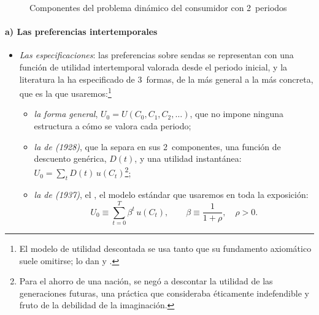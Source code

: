 \documentclass[11pt]{article}
\begin{document}
\begin{itemize}
  \begin{figure}[H]
  \centering
  \caption{Componentes del problema dinámico del consumidor con 2~periodos}\label{fig:componentes}
  \end{figure}
\end{itemize}

\paragraph{a) Las preferencias intertemporales}

\begin{itemize}
\item \emph{Las especificaciones}: las preferencias sobre sendas se representan con una función de utilidad intertemporal valorada desde el periodo inicial, y la literatura la ha especificado de 3~formas, de la más general a la más concreta, que es la que usaremos:\footnote{El modelo de utilidad descontada se usa tanto que su fundamento axiomático suele omitirse; lo dan \textcite{Koopmans1960Stationary} y \textcite{FishburnRubinstein1982Time}.}
  \begin{itemize}
  \item \emph{la forma general}, $U_0=U(C_0,C_1,C_2,\dots)$, que no impone ninguna estructura a cómo se valora cada periodo;
  \item \emph{la de  (1928)}, que la separa en sus 2~componentes, una función de descuento genérica, $D(t)$, y una utilidad instantánea: $U_0=\sum_tD(t)\,u(C_t)$\footnote{Para el ahorro de una nación,  se negó a descontar la utilidad de las generaciones futuras, una práctica que consideraba éticamente indefendible y fruto de la debilidad de la imaginación\nocite{Ramsey1928}.};
  \item \emph{la de  (1937)}, el , el modelo estándar que usaremos en toda la exposición\nocite{Samuelson1937}:
    \begin{equation}
    U_0\equiv\sum_{t=0}^{T}\beta^t\,u(C_t),\qquad\beta\equiv\frac{1}{1+\rho},\quad\rho>0.\label{eq:utilidad-intertemporal}
    \end{equation}
  \end{itemize}

\end{itemize}
\end{document}

